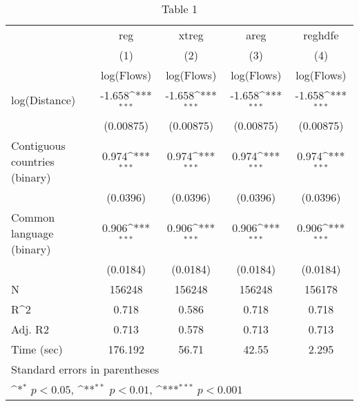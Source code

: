 \begin{table}[htbp]\centering
\def\sym#1{\ifmmode^{#1}\else\(^{#1}\)\fi}
\caption{Table 1}
\begin{tabular}{l*{4}{c}}
\hline\hline
                    &\multicolumn{1}{c}{reg}         &\multicolumn{1}{c}{xtreg}         &\multicolumn{1}{c}{areg}         &\multicolumn{1}{c}{reghdfe}         \\
                    &\multicolumn{1}{c}{(1)}&\multicolumn{1}{c}{(2)}&\multicolumn{1}{c}{(3)}&\multicolumn{1}{c}{(4)}\\
                    &\multicolumn{1}{c}{log(Flows)}&\multicolumn{1}{c}{log(Flows)}&\multicolumn{1}{c}{log(Flows)}&\multicolumn{1}{c}{log(Flows)}\\
\hline
log(Distance)       &      -1.658\sym{***}&      -1.658\sym{***}&      -1.658\sym{***}&      -1.658\sym{***}\\
                    &   (0.00875)         &   (0.00875)         &   (0.00875)         &   (0.00875)         \\
[1em]
Contiguous countries (binary)&       0.974\sym{***}&       0.974\sym{***}&       0.974\sym{***}&       0.974\sym{***}\\
                    &    (0.0396)         &    (0.0396)         &    (0.0396)         &    (0.0396)         \\
[1em]
Common language (binary)&       0.906\sym{***}&       0.906\sym{***}&       0.906\sym{***}&       0.906\sym{***}\\
                    &    (0.0184)         &    (0.0184)         &    (0.0184)         &    (0.0184)         \\
\hline
N                   &      156248         &      156248         &      156248         &      156178         \\
R^2                 &       0.718         &       0.586         &       0.718         &       0.718         \\
Adj. R2             &       0.713         &       0.578         &       0.713         &       0.713         \\
Time (sec)          &     176.192         &       56.71         &       42.55         &       2.295         \\
\hline\hline
\multicolumn{5}{l}{\footnotesize Standard errors in parentheses}\\
\multicolumn{5}{l}{\footnotesize \sym{*} \(p<0.05\), \sym{**} \(p<0.01\), \sym{***} \(p<0.001\)}\\
\end{tabular}
\end{table}
